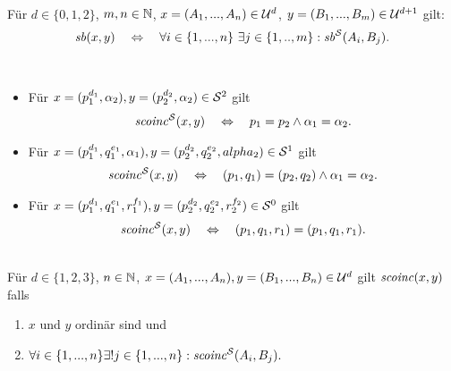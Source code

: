 \begin{dfn}[$\Gsb$]\ \\
    Für $d \in \{0,1,2\}$, $m,n \in \mathbb{N}$, $x=(A_1, ..., A_n) \in \mathcal{U}^d$, $y=(B_1, ..., B_m) \in \mathcal{U}^{d+1}$ gilt:
    $$\mathit{sb}(x,y) \quad \Leftrightarrow \quad \forall i \in \{1, ..., n\}\ \exists j \in \{1, .., m\}: \mathit{sb}^{\mathcal{S}}(A_i,B_j). $$
\end{dfn}


\begin{dfn}[$\Gscoinc^\einf$]\ 
    \begin{itemize}
        \item Für $x = (p_1^{d_1},\alpha_2), y = (p_2^{d_2},\alpha_2) \in \mathcal{S}^2$ gilt
            \begin{align*}
                \mathit{scoinc}^{\mathcal{S}}(x,y) 
                \quad \Leftrightarrow \quad 
                p_1 = p_2 \land \alpha_1 = \alpha_2.
            \end{align*}
        \item Für $x = (p_1^{d_1},q_1^{e_1},\alpha_1), y = (p_2^{d_2},q_2^{e_2},alpha_2) \in \mathcal{S}^1$ gilt
            \begin{align*}
                \mathit{scoinc}^{\mathcal{S}}(x,y) 
                \quad \Leftrightarrow \quad 
                (p_1, q_1) = (p_2,q_2) \land \alpha_1 = \alpha_2.
            \end{align*}
        \item Für $x = (p_1^{d_1},q_1^{e_1},r_1^{f_1}), y = (p_2^{d_2},q_2^{e_2},r_2^{f_2}) \in \mathcal{S}^0$ gilt
            \begin{align*}
                \mathit{scoinc}^{\mathcal{S}}(x,y) 
                \quad \Leftrightarrow \quad 
                (p_1,q_1,r_1) = (p_1,q_1,r_1).
            \end{align*}
    \end{itemize}
\end{dfn}


\begin{dfn}[$\Gscoinc$]\ \\
    Für $d \in \{1,2,3\}$, $n \in \mathbb{N}$, $x=(A_1, ... , A_n), y=(B_1, ..., B_n) \in \mathcal{U}^d$ gilt $\mathit{scoinc}(x,y)$ falls
    \begin{enumerate}
     \item $x$ und $y$ ordinär sind und
     \item $\forall i \in \{1, ..., n\} \exists! j \in \{1, ..., n\} : \mathit{scoinc}^{\mathcal{S}}(A_i,B_j).$
    \end{enumerate}
\end{dfn}


